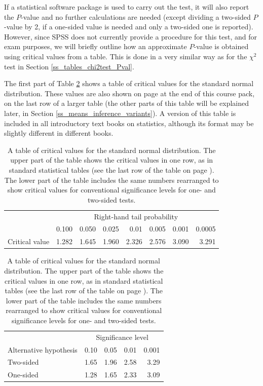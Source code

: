 If a statistical software package is used to carry out the
test, it will
also report the $P$-value and no further calculations are needed (except
dividing a two-sided $P$-value by 2, if a one-sided value is
needed and only a two-sided one is reported). However, since SPSS does
not currently provide a procedure for this test, and for exam purposes,
we will briefly outline how an approximate $P$-value is obtained using
critical values from a table. This is done in a very similar way as for
the $\chi^{2}$ test in Section \ref{ss_tables_chi2test_Pval}.

The first part of Table \ref{t_ttable} shows a table of critical values
for the standard normal distribution. These
values are also shown on page \pageref{s_disttables_t} at the end of
this course pack, on the last row of a larger table (the other parts of
this table will be explained later, in Section
\ref{ss_means_inference_variants}). A version of this
table is included in all introductory text books on statistics, although
its format may be slightly different in different books.

\begin{table}
\caption{A table of critical values for
the standard normal distribution. The upper part of the table shows
the critical values in one row, as in standard statistical tables
(see the last row of the table on page \pageref{s_disttables_t}). The
lower part of the table includes the same numbers rearranged
to show
critical values for conventional significance levels for one- and
two-sided tests.
}
\label{t_ttable}
\begin{center}
\begin{tabular}{|l|rrrrrrr|}\hline
& \multicolumn{7}{|c|}{Right-hand tail probability} \\ \cline{2-8}
& 0.100 & 0.050 & 0.025 & 0.01 & 0.005 & 0.001 & 0.0005 \\ \hline
Critical value &
1.282 & 1.645 & 1.960 & 2.326 & 2.576 & 3.090 & 3.291 \\
\hline
\end{tabular}


\begin{tabular}{|l|rrrr|}\hline
& \multicolumn{4}{|c|}{Significance level} \\ \cline{2-5}
Alternative hypothesis & 0.10 & 0.05 & 0.01 & 0.001 \\ \hline
Two-sided & 1.65 & 1.96 & 2.58 & 3.29\\
One-sided & 1.28 & 1.65 & 2.33 & 3.09 \\ \hline
\end{tabular}
\end{center}
\end{table}

